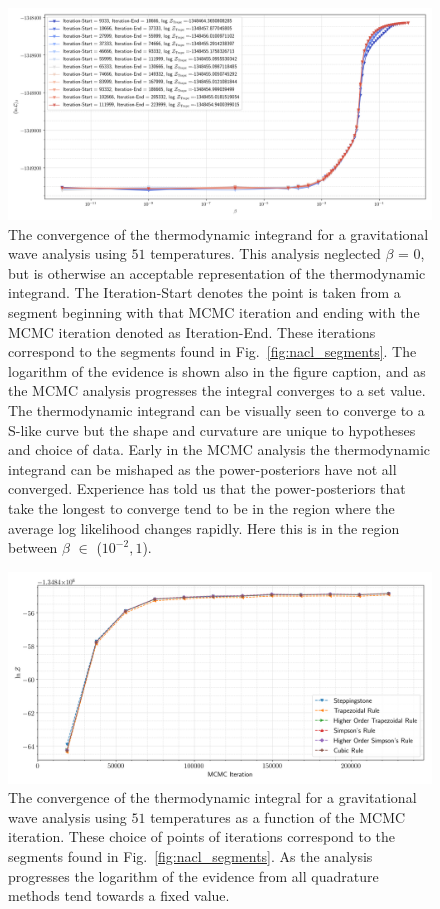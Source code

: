 \begin{figure}[th]
\centering
\includegraphics[width=1.0\columnwidth]{figs/chapter6/lsc_sim_integrand_progress.png}
\caption{The convergence of the thermodynamic integrand for a gravitational wave analysis using $51$ temperatures. This analysis neglected $\beta$ = $0$, but is otherwise an acceptable representation of the thermodynamic integrand. The Iteration-Start denotes the point is taken from a segment beginning with that MCMC iteration and ending with the MCMC iteration denoted as Iteration-End. These iterations correspond to the segments found in Fig.~\ref{fig:nacl_segments}. The logarithm of the evidence is shown also in the figure caption, and as the MCMC analysis progresses the integral converges to a set value. The thermodynamic integrand can be visually seen to converge to a S-like curve but the shape and curvature are unique to hypotheses and choice of data. Early in the MCMC analysis the thermodynamic integrand can be mishaped as the power-posteriors have not all converged. Experience has told us that the power-posteriors that take the longest to converge tend to be in the region where the average log likelihood changes rapidly. Here this is in the region between $\beta$ $\in$ ($10^{-2}, 1$).}
\label{fig:integrand_convergence}
\end{figure}

\begin{figure}[th]
\centering
\includegraphics[width=1.0\columnwidth]{figs/chapter6/lvc_sim_evidence_convergence.png}
\caption{The convergence of the thermodynamic integral for a gravitational wave analysis using $51$ temperatures as a function of the MCMC iteration. These choice of points of iterations correspond to the segments found in Fig.~\ref{fig:nacl_segments}. As the analysis progresses the logarithm of the evidence from all quadrature methods tend towards a fixed value.}
\label{fig:integral_convergence}
\end{figure}

